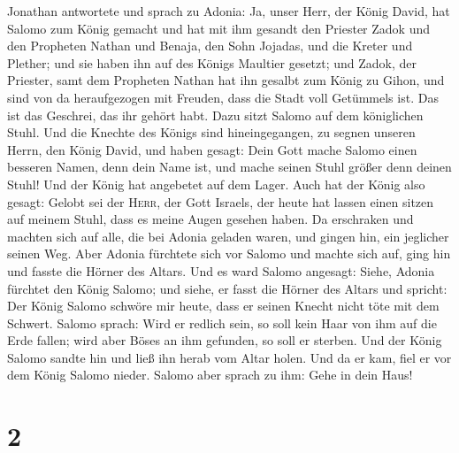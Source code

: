 Jonathan antwortete und sprach zu Adonia: Ja, unser
Herr, der König David, hat Salomo zum König gemacht  und
hat mit ihm gesandt den Priester Zadok und den Propheten Nathan und
Benaja, den Sohn Jojadas, und die Kreter und Plether; und sie haben ihn
auf des Königs Maultier gesetzt;  und Zadok, der
Priester, samt dem Propheten Nathan hat ihn gesalbt zum König zu Gihon,
und sind von da heraufgezogen mit Freuden, dass die Stadt voll Getümmels
ist. Das ist das Geschrei, das ihr gehört habt.  Dazu
sitzt Salomo auf dem königlichen Stuhl.  Und die Knechte
des Königs sind hineingegangen, zu segnen unseren Herrn, den König
David, und haben gesagt: Dein Gott mache Salomo einen besseren Namen,
denn dein Name ist, und mache seinen Stuhl größer denn deinen Stuhl! Und
der König hat angebetet auf dem Lager.  Auch hat der
König also gesagt: Gelobt sei der \textsc{Herr}, der Gott Israels, der
heute hat lassen einen sitzen auf meinem Stuhl, dass es meine Augen
gesehen haben.  Da erschraken und machten sich auf alle,
die bei Adonia geladen waren, und gingen hin, ein jeglicher seinen Weg.
 Aber Adonia fürchtete sich vor Salomo und machte sich
auf, ging hin und fasste die Hörner des Altars.  Und es
ward Salomo angesagt: Siehe, Adonia fürchtet den König Salomo; und
siehe, er fasst die Hörner des Altars und spricht: Der König Salomo
schwöre mir heute, dass er seinen Knecht nicht töte mit dem Schwert.
 Salomo sprach: Wird er redlich sein, so soll kein Haar
von ihm auf die Erde fallen; wird aber Böses an ihm gefunden, so soll er
sterben.  Und der König Salomo sandte hin und ließ ihn
herab vom Altar holen. Und da er kam, fiel er vor dem König Salomo
nieder. Salomo aber sprach zu ihm: Gehe in dein Haus!

\hypertarget{section-1}{%
\section{2}\label{section-1}}

